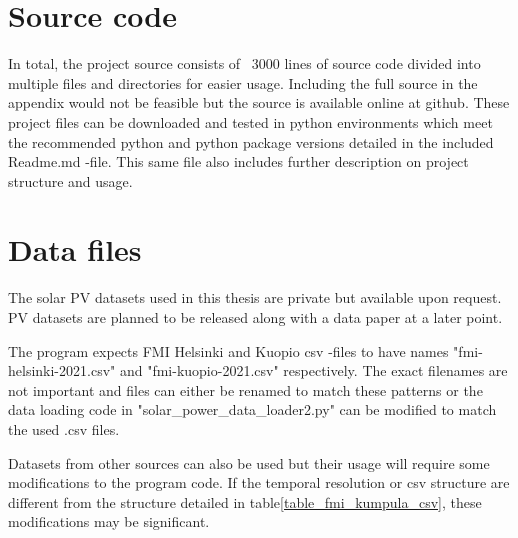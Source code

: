\appendix
\section{Source code}
In total, the project source consists of ~3000 lines of source code divided into multiple files and directories for easier usage. Including the full source in the appendix would not be feasible but the source is available online at github\cite{project_source}. These project files can be downloaded and tested in python environments which meet the recommended python and python package versions detailed in the included Readme.md -file. This same file also includes further description on project structure and usage.


\section{Data files}
The solar PV datasets used in this thesis are private but available upon request. PV datasets are planned to be released along with a data paper at a later point.

The program expects FMI Helsinki and Kuopio csv -files to have names "fmi-helsinki-2021.csv" and "fmi-kuopio-2021.csv" respectively. The exact filenames are not important and files can either be renamed to match these patterns or the data loading code in "solar\_power\_data\_loader2.py" can be modified to match the used .csv files.

Datasets from other sources can also be used but their usage will require some modifications to the program code. If the temporal resolution or csv structure are different from the structure detailed in table\ref{table_fmi_kumpula_csv}, these modifications may be significant.